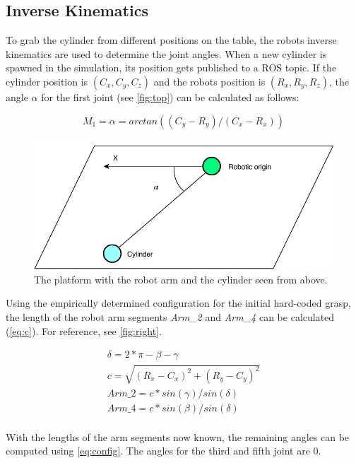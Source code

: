 \subsection{Inverse Kinematics}
To grab the cylinder from different positions on the table, the robots inverse kinematics are used to determine the joint angles.
When a new cylinder is spawned in the simulation, its position gets published to a ROS topic.
If the cylinder position is $(C_x, C_y, C_z)$ and the robots position is $(R_x, R_y, R_z)$, the angle $\alpha$ for the first joint (see \autoref{fig:top}) can be calculated as follows:

\begin{equation}
\label{simple_equation}
M_1=\alpha = arctan((C_y-R_y)/(C_x-R_x))
\end{equation}

\begin{figure}[htpb]
\centering
	\includegraphics[width=0.9\linewidth]{figures/top_view.pdf} 
	\caption{The platform with the robot arm and the cylinder seen from above.}
	\label{fig:top}
\end{figure}

Using the empirically determined configuration for the initial hard-coded grasp, the length of the robot arm segments \textit{Arm\_2} and \textit{Arm\_4} can be calculated (\autoref{eq:c}).
For reference, see \autoref{fig:right}.

\begin{equation}
\begin{aligned}
\delta=2*\pi-\beta-\gamma\\
c=\sqrt{(R_x-C_x)^2+(R_y-C_y)^2}\\
\textit{Arm\_2}=c*sin(\gamma)/sin(\delta)\\
\textit{Arm\_4}=c*sin(\beta)/sin(\delta)\\
\label{eq:c}
\end{aligned}
\end{equation}

With the lengths of the arm segments now known, the remaining angles can be computed using \autoref{eq:config}.
The angles for the third and fifth joint are $0$.

